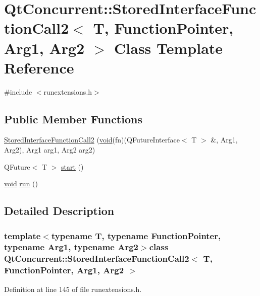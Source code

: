 \hypertarget{class_qt_concurrent_1_1_stored_interface_function_call2}{\section{\-Qt\-Concurrent\-:\-:\-Stored\-Interface\-Function\-Call2$<$ \-T, \-Function\-Pointer, \-Arg1, \-Arg2 $>$ \-Class \-Template \-Reference}
\label{class_qt_concurrent_1_1_stored_interface_function_call2}
}


{\ttfamily \#include $<$runextensions.\-h$>$}

\subsection*{\-Public \-Member \-Functions}
\begin{DoxyCompactItemize}
\item 
\hyperlink{class_qt_concurrent_1_1_stored_interface_function_call2_abaffb8e88612a15facf44c133fe5bd27}{\-Stored\-Interface\-Function\-Call2} (\hyperlink{group___u_a_v_objects_plugin_ga444cf2ff3f0ecbe028adce838d373f5c}{void}(fn)(\-Q\-Future\-Interface$<$ \-T $>$ \&, \-Arg1, \-Arg2), \-Arg1 arg1, \-Arg2 arg2)
\item 
\-Q\-Future$<$ \-T $>$ \hyperlink{class_qt_concurrent_1_1_stored_interface_function_call2_a4862bd98bba7a867b5f4b3c2d333deb7}{start} ()
\item 
\hyperlink{group___u_a_v_objects_plugin_ga444cf2ff3f0ecbe028adce838d373f5c}{void} \hyperlink{class_qt_concurrent_1_1_stored_interface_function_call2_a2f9ed8e39b5b388b6752ce436d4e2c81}{run} ()
\end{DoxyCompactItemize}


\subsection{\-Detailed \-Description}
\subsubsection*{template$<$typename T, typename Function\-Pointer, typename Arg1, typename Arg2$>$class Qt\-Concurrent\-::\-Stored\-Interface\-Function\-Call2$<$ T, Function\-Pointer, Arg1, Arg2 $>$}



\-Definition at line 145 of file runextensions.\-h.



